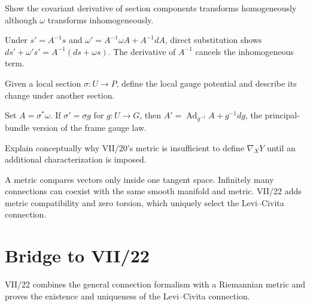\begin{problem}\label{prob:vii21-ch03}
Show the covariant derivative of section components transforms homogeneously although \(\omega\) transforms inhomogeneously.
\end{problem}
\begin{solution}
Under \(s'=A^{-1}s\) and \(\omega'=A^{-1}\omega A+A^{-1}dA\), direct substitution shows \(ds'+\omega's'=A^{-1}(ds+\omega s)\). The derivative of \(A^{-1}\) cancels the inhomogeneous term.
\end{solution}

\begin{problem}\label{prob:vii21-ch04}
Given a local section \(\sigma:U\to P\), define the local gauge potential and describe its change under another section.
\end{problem}
\begin{solution}
Set \(A=\sigma^*\omega\). If \(\sigma'=\sigma g\) for \(g:U\to G\), then \(A'=\operatorname{Ad}_{g^{-1}}A+g^{-1}dg\), the principal-bundle version of the frame gauge law.
\end{solution}

\begin{problem}\label{prob:vii21-ch05}
Explain conceptually why VII/20's metric is insufficient to define \(\nabla_XY\) until an additional characterization is imposed.
\end{problem}
\begin{solution}
A metric compares vectors only inside one tangent space. Infinitely many connections can coexist with the same smooth manifold and metric. VII/22 adds metric compatibility and zero torsion, which uniquely select the Levi--Civita connection.
\end{solution}

\section*{Bridge to VII/22}
VII/22 combines the general connection formalism with a Riemannian metric and proves the existence and uniqueness of the Levi--Civita connection.
